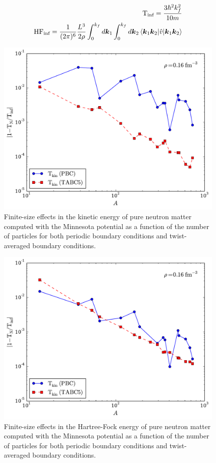 \begin{align}
  \text{T}_{\text{inf}}=\frac{3\hbar^{2}k_{f}^{2}}{10m} \\
  \text{HF}_{\text{inf}}=\frac{1}{\mathop{(2\pi)^{6}}}\frac{L^{3}}{2\rho}\int_{0}^{k_{f}}d\vec{k}_{1}\int_{0}^{k_{f}}d\vec{k}_{2}\braket{\vec{k}_{1}\vec{k}_{2}|\hat{v}|\vec{k}_{1}\vec{k}_{2}}
\end{align}

\begin{figure}
  \includegraphics[width=\linewidth]{Chapter9-figures/fig3.pdf}
  \caption{Finite-size effects in the kinetic energy of pure neutron matter computed with the Minnesota potential as a function of the number of particles for both periodic boundary conditions and twist-averaged boundary conditions.}
  \label{fig:fig3}
\end{figure}

\begin{figure}
  \includegraphics[width=\linewidth]{Chapter9-figures/fig4.pdf}
  \caption{Finite-size effects in the Hartree-Fock energy of pure neutron matter computed with the Minnesota potential as a function of the number of particles for both periodic boundary conditions and twist-averaged boundary conditions.}
  \label{fig:fig4}
\end{figure}





